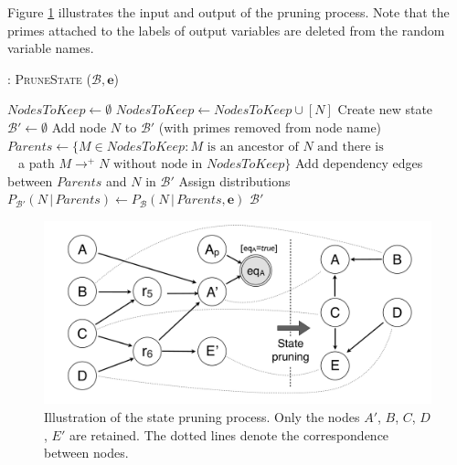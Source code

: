 Figure \ref{fig:pruning} illustrates the input and output of the pruning process. Note that the primes attached to the labels of output variables are deleted from the random variable names.

\begin{algorithm}[ht]
\caption{: \textsc{PruneState} ($\mathcal{B}, \mathbf{e}$)}
\begin{algorithmic}[1] \vspace{1mm}
\STATE $\mathit{NodesToKeep} \leftarrow \emptyset$
\STATE $\mathit{NodesToKeep} \leftarrow \mathit{NodesToKeep} \cup [N]$ 
\ENDIF
\ENDFOR
\STATE Create new state $\mathcal{B}' \leftarrow \emptyset$
\STATE Add node $N$ to $\mathcal{B}'$ (with primes removed from node name)
\STATE $\mathit{Parents} \leftarrow \{M \in \mathit{NodesToKeep} : M \text{ is an ancestor of } N \text{ and there is } $ \\ $\phantom{a}$  \; \; \; \; \; \; \; \; \;  a path $M \rightarrow^+  N \text{ without node in } \mathit{NodesToKeep} \}$ 
\STATE Add dependency edges between $\mathit{Parents}$ and $N$ in $\mathcal{B}'$
\STATE Assign distributions $P_{\mathcal{B}'}(N \, | \, \mathit{Parents}) \leftarrow P_{\mathcal{B}}(N \, | \, \mathit{Parents}, \mathbf{e})$
\ENDFOR
\RETURN $\mathcal{B}'$
\end{algorithmic}
\label{algo:pruneState}
\end{algorithm}


\begin{figure}[ht]
\centering
\includegraphics[scale=0.23]{imgs/pruning.pdf}
\caption{Illustration of the state pruning process. Only the nodes $A'$, $B$, $C$, $D$, $E'$ are retained. The dotted lines denote the correspondence between nodes.}
\label{fig:pruning}
\end{figure}


